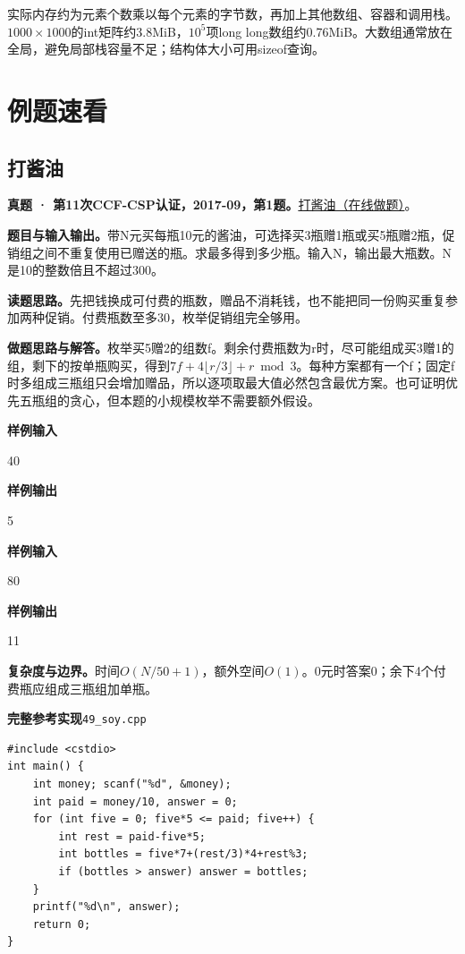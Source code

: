 \documentclass[UTF8,11pt,a4paper,fontset=none]{ctexart}
\begin{document}
实际内存约为元素个数乘以每个元素的字节数，再加上其他数组、容器和调用栈。$1000\times1000$的int矩阵约3.8MiB，$10^5$项long long数组约0.76MiB。大数组通常放在全局，避免局部栈容量不足；结构体大小可用sizeof查询。

\section{例题速看}
\subsection{打酱油}
\textbf{真题 · 第11次CCF-CSP认证，2017-09，第1题。}\href{https://www.acwing.com/problem/content/3250/}{打酱油（在线做题）}。

\noindent\textbf{题目与输入输出。}带N元买每瓶10元的酱油，可选择买3瓶赠1瓶或买5瓶赠2瓶，促销组之间不重复使用已赠送的瓶。求最多得到多少瓶。输入N，输出最大瓶数。N是10的整数倍且不超过300。

\noindent\textbf{读题思路。}先把钱换成可付费的瓶数，赠品不消耗钱，也不能把同一份购买重复参加两种促销。付费瓶数至多30，枚举促销组完全够用。

\noindent\textbf{做题思路与解答。}枚举买5赠2的组数f。剩余付费瓶数为r时，尽可能组成买3赠1的组，剩下的按单瓶购买，得到$7f+4\lfloor r/3\rfloor+r\bmod3$。每种方案都有一个f；固定f时多组成三瓶组只会增加赠品，所以逐项取最大值必然包含最优方案。也可证明优先五瓶组的贪心，但本题的小规模枚举不需要额外假设。
\begin{tcolorbox}[samplebox,title={输入输出样例}]
\textbf{样例输入}
\begin{Sample}
40
\end{Sample}
\tcblower
\textbf{样例输出}
\begin{Sample}
5
\end{Sample}
\end{tcolorbox}
\begin{tcolorbox}[samplebox,title={输入输出样例}]
\textbf{样例输入}
\begin{Sample}
80
\end{Sample}
\tcblower
\textbf{样例输出}
\begin{Sample}
11
\end{Sample}
\end{tcolorbox}

\noindent\textbf{复杂度与边界。}时间$O(N/50+1)$，额外空间$O(1)$。0元时答案0；余下4个付费瓶应组成三瓶组加单瓶。
\par\noindent\begin{minipage}{\linewidth}
\textbf{完整参考实现}\quad\texttt{49\_soy.cpp}
\begin{lstlisting}
#include <cstdio>
int main() {
    int money; scanf("%d", &money);
    int paid = money/10, answer = 0;
    for (int five = 0; five*5 <= paid; five++) {
        int rest = paid-five*5;
        int bottles = five*7+(rest/3)*4+rest%3;
        if (bottles > answer) answer = bottles;
    }
    printf("%d\n", answer);
    return 0;
}
\end{lstlisting}
\end{minipage}\par
\end{document}
